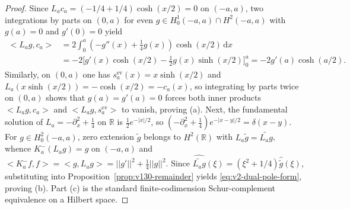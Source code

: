 \documentclass[11pt]{article}
\def\norm#1{||#1||}%
\def\ip#1#2{<#1,#2>}%
\theoremstyle{remark}
\newcommand{\norm}[1]{\left\lVert #1\right\rVert}
\newcommand{\ip}[2]{\left\langle #1,#2\right\rangle}
\newcommand{\dd}{\mathrm d}
\begin{document}
\begin{proof}
Since $L_a c_a = (-1/4+1/4)\cosh(x/2)=0$ on $(-a,a)$, two integrations by parts on $(0,a)$ for even $g\in H_0^1(-a,a)\cap H^2(-a,a)$ with $g(a)=0$ and $g'(0)=0$ yield
\begin{align*}
 \ip{L_a g}{c_a} &= 2\int_0^a (-g''(x)+\tfrac14 g(x))\cosh(x/2)\,\dd x \\
 &= -2\bigl[g'(x)\cosh(x/2)-\tfrac12 g(x)\sinh(x/2)\bigr]_0^a = -2g'(a)\cosh(a/2).
\end{align*}
Similarly, on $(0,a)$ one has $s_a^{\mathrm{ev}}(x)=x\sinh(x/2)$ and $L_a(x\sinh(x/2))=-\cosh(x/2)=-c_a(x)$, so integrating by parts twice on $(0,a)$ shows that $g(a)=g'(a)=0$ forces both inner products $\ip{L_a g}{c_a}$ and $\ip{L_a g}{s_a^{\mathrm{ev}}}$ to vanish, proving (a). Next, the fundamental solution of $L_a = -\partial_x^2+\tfrac14$ on $\mathbb R$ is $\tfrac12 e^{-|x|/2}$, so $(-\partial_x^2+\tfrac14)e^{-|x-y|/2}=\delta(x-y)$. For $g\in H_0^2(-a,a)$, zero extension $\widetilde g$ belongs to $H^2(\mathbb R)$ with $L_a\widetilde g = \widetilde{L_a g}$, whence $K_a^-(L_a g) = g$ on $(-a,a)$ and $\ip{K_a^- f}{f}=\ip{g}{L_a g}=\norm{g'}^2+\tfrac14\norm{g}^2$. Since $\widehat{\widetilde{L_a g}}(\xi)=(\xi^2+1/4)\widehat{\widetilde g}(\xi)$, substituting into Proposition~\ref{prop:v130-remainder} yields \eqref{eq:v2-dual-pole-form}, proving (b). Part (c) is the standard finite-codimension Schur-complement equivalence on a Hilbert space.
\end{proof}
\end{document}
